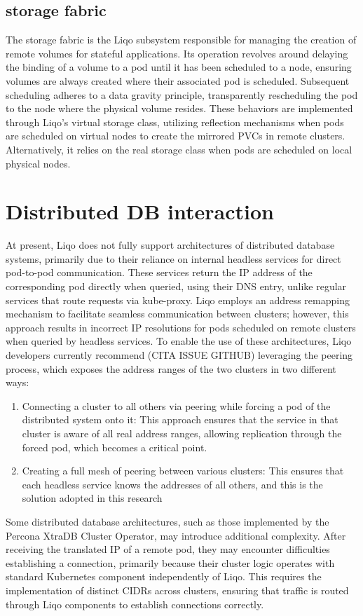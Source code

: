 \subsection{storage fabric}
The storage fabric is the Liqo subsystem responsible for managing the creation of remote volumes for stateful applications. Its operation revolves around delaying the binding of a volume to a pod until it has been scheduled to a node, ensuring volumes are always created where their associated pod is scheduled. Subsequent scheduling adheres to a data gravity principle, transparently rescheduling the pod to the node where the physical volume resides. These behaviors are implemented through Liqo's virtual storage class, utilizing reflection mechanisms when pods are scheduled on virtual nodes to create the mirrored PVCs in remote clusters. Alternatively, it relies on the real storage class when pods are scheduled on local physical nodes.

\section{Distributed DB interaction}
At present, Liqo does not fully support architectures of distributed database systems, primarily due to their reliance on internal headless services for direct pod-to-pod communication. These services return the IP address of the corresponding pod directly when queried, using their DNS entry, unlike regular services that route requests via kube-proxy. Liqo employs an address remapping mechanism to facilitate seamless communication between clusters; however, this approach results in incorrect IP resolutions for pods scheduled on remote clusters when queried by headless services.
To enable the use of these architectures, Liqo developers currently recommend (CITA ISSUE GITHUB) leveraging the peering process, which exposes the address ranges of the two clusters in two different ways:
\begin{enumerate}
\item Connecting a cluster to all others via peering while forcing a pod of the distributed system onto it: This approach ensures that the service in that cluster is aware of all real address ranges, allowing replication through the forced pod, which becomes a critical point.
\item Creating a full mesh of peering between various clusters: This ensures that each headless service knows the addresses of all others, and this is the solution adopted in this research
\end{enumerate}
Some distributed database architectures, such as those implemented by the Percona XtraDB Cluster Operator, may introduce additional complexity. After receiving the translated IP of a remote pod, they may encounter difficulties establishing a connection, primarily because their cluster logic operates with standard Kubernetes component independently of Liqo. This requires the implementation of distinct CIDRs across clusters, ensuring that traffic is routed through Liqo components to establish connections correctly.